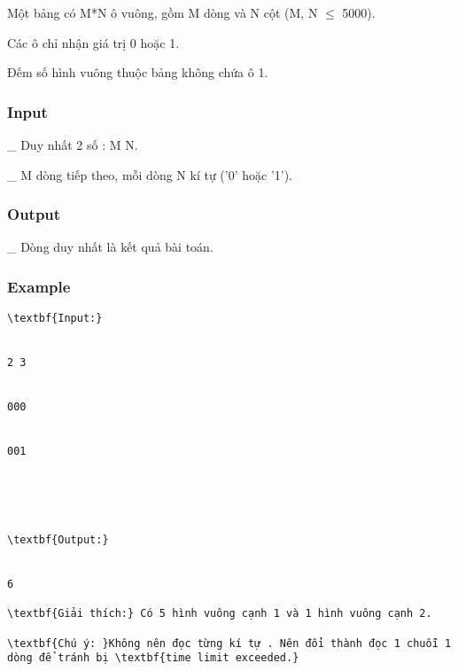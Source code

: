 



   Một bảng có M*N ô vuông, gồm M dòng và N cột (M, N  $\le$  5000).  

   Các ô chỉ nhận giá trị 0 hoặc 1.  

   Đếm số hình vuông thuộc bảng không chứa ô 1.  

\subsubsection{   Input  }

   \_ Duy nhất 2 số : M N.  

   \_ M dòng tiếp theo, mỗi dòng N kí tự ('0' hoặc '1').  

\subsubsection{   Output  }

   \_ Dòng duy nhất là kết quả bài toán.  

\subsubsection{   Example  }
\begin{verbatim}
\textbf{Input:}


2 3


000


001





\textbf{Output:}


6

\textbf{Giải thích:} Có 5 hình vuông cạnh 1 và 1 hình vuông cạnh 2.

\textbf{Chú ý: }Không nên đọc từng kí tự . Nên đổi thành đọc 1 chuỗi 1 dòng để tránh bị \textbf{time limit exceeded.}\end{verbatim}
